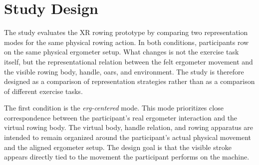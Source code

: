 \section{Study Design}
\label{sec:study_design_overview}

The study evaluates the XR rowing prototype by comparing two representation modes for the same physical rowing action.
In both conditions, participants row on the same physical ergometer setup.
What changes is not the exercise task itself, but the representational relation between the felt ergometer movement and the visible rowing body, handle, oars, and environment.
The study is therefore designed as a comparison of representation strategies rather than as a comparison of different exercise tasks.

The first condition is the \emph{erg-centered} mode.
This mode prioritizes close correspondence between the participant's real ergometer interaction and the virtual rowing body.
The virtual body, handle relation, and rowing apparatus are intended to remain organized around the participant's actual physical movement and the aligned ergometer setup.
The design goal is that the visible stroke appears directly tied to the movement the participant performs on the machine.

